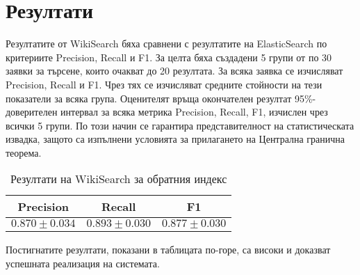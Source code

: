 \documentclass[a4paper,12pt]{article} \usepackage[utf8]{inputenc}
\begin{document}
\section{Резултати} Резултатите от WikiSearch бяха сравнени с резултатите на
ElasticSearch по критериите Precision, Recall и F1. За целта бяха създадени 5
групи от по 30 заявки за търсене, които очакват до 20 резултата. За всяка заявка
се изчисляват Precision, Recall и F1. Чрез тях се изчисляват средните стойности
на тези показатели за всяка група. Оценителят връща окончателен резултат
95\%-доверителен интервал за всяка метрика Precision, Recall, F1, изчислен чрез
всички 5 групи. По този начин се гарантира представителност на статистическата
извадка, защото са изпълнени условията за прилагането на Централна гранична
теорема.

\begin{table}[h] \centering \begin{tabular}{|c|c|c|} \hline Precision & Recall
& F1 \\ \hline $0.870\pm0.034$ & $0.893\pm0.030$& $0.877\pm0.030$ \\ \hline
\end{tabular} \caption{Резултати на WikiSearch за обратния индекс} \end{table}
Постигнатите резултати, показани в таблицата по-горе, са високи и доказват
успешната реализация на системата.
\end{document}
